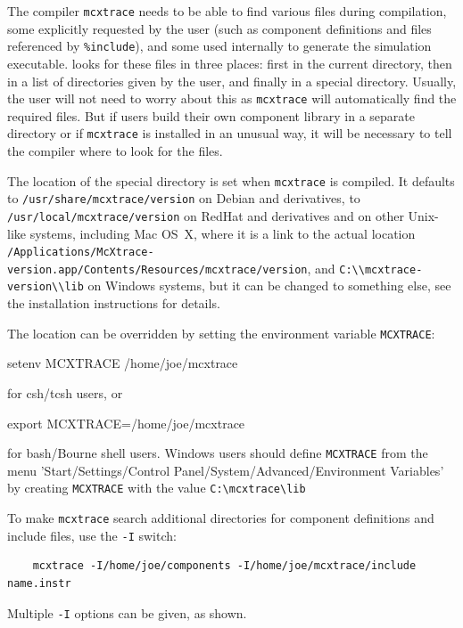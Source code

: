 The \MCX compiler \texttt{mcxtrace}
needs to be able to find various files during compilation,
some explicitly requested by the user (such as component definitions and files
referenced by \verb+%include+), 
and some used internally to generate the simulation executable.
\MCX looks for
these files in three places: first in the current directory, then in a list of
directories given by the user, and finally in a special \MCX directory.
Usually, the user will not need to worry about this as \texttt{mcxtrace} will
automatically find the required files. But if users build their own component
library in a separate directory or if \texttt{mcxtrace} is installed in an unusual way, it
will be necessary to tell the compiler where to look for the files.

The location of the special \MCX directory is set
when \texttt{mcxtrace} is compiled.
It defaults to \nolinkurl{/usr/share/mcxtrace/version} on Debian and derivatives,
to \nolinkurl{/usr/local/mcxtrace/version} on RedHat and derivatives
and on other Unix-like systems, including Mac OS~X,
where it is a link to the actual location
\nolinkurl{/Applications/McXtrace-version.app/Contents/Resources/mcxtrace/version},
and \nolinkurl{C:\\mcxtrace-version\\lib} on Windows systems,
but it can be changed to something else,
see the installation instructions for details.

The location can be
overridden by setting the environment variable \verb+MCXTRACE+:
\begin{bash}
    setenv MCXTRACE /home/joe/mcxtrace
\end{bash}
for csh/tcsh users, or
\begin{bash}
    export MCXTRACE=/home/joe/mcxtrace
\end{bash}
for bash/Bourne shell users.  Windows users should define
\verb+MCXTRACE+ from the menu 'Start/Settings/Control
Panel/System/Advanced/Environment Variables' by creating \verb+MCXTRACE+ with the
value \verb+C:\mcxtrace\lib+

To make \texttt{mcxtrace} search additional directories for component definitions
and include files, use the \verb+-I+ switch:
\begin{lstlisting}
    mcxtrace -I/home/joe/components -I/home/joe/mcxtrace/include name.instr
\end{lstlisting}
Multiple \verb+-I+ options can be given, as shown.


